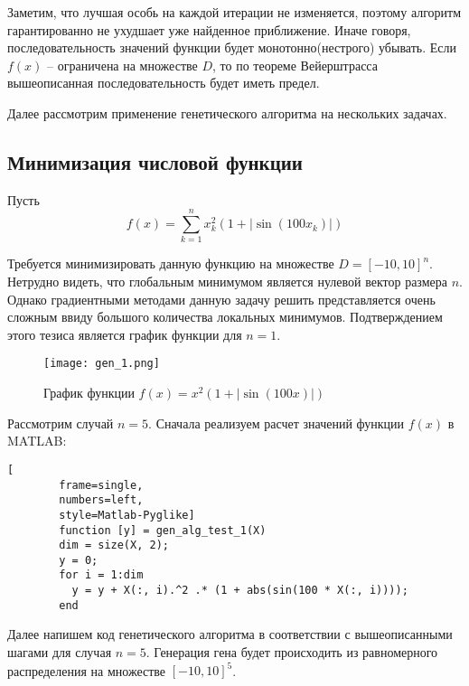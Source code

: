 \documentclass[../main.tex]{subfiles}
\begin{document}
	Заметим, что лучшая особь на каждой итерации не изменяется, поэтому алгоритм гарантированно не ухудшает уже найденное приближение. Иначе говоря, последовательность значений функции будет монотонно(нестрого) убывать. Если $f(x)$ -- ограничена на множестве $D$, то по теореме Вейерштрасса вышеописанная последовательность будет иметь предел.
	
	Далее рассмотрим применение генетического алгоритма на нескольких задачах.
	
	\subsection{Минимизация числовой функции}
	
	Пусть 
	\[f(x) = \sum_{k=1}^{n}x_k^2 (1 + |\sin{(100x_k)}|)\]
	
	Требуется минимизировать данную функцию на множестве $D = [-10, 10]^n$. Нетрудно видеть, что глобальным минимумом является нулевой вектор размера $n$. Однако градиентными методами данную задачу решить представляется очень сложным ввиду большого количества локальных минимумов. Подтверждением этого тезиса является график функции для $n=1$.
	
	
	\begin{figure}[H]
		\texttt{[image: gen\_1.png]}{}
		\caption{График функции $f(x) = x^2 (1 + |\sin(100x)|)$}
		\label{fig: gen_alg_test_1}
	\end{figure}
	
	
	
	
	Рассмотрим случай $n=5$. Сначала реализуем расчет значений функции $f(x)$ в MATLAB: 
	
	\begin{lstlisting}[
		frame=single,
		numbers=left,
		style=Matlab-Pyglike]
		function [y] = gen_alg_test_1(X)
		dim = size(X, 2);
		y = 0;
		for i = 1:dim
		  y = y + X(:, i).^2 .* (1 + abs(sin(100 * X(:, i))));
		end		
	\end{lstlisting}

	Далее напишем код генетического алгоритма в соответствии с вышеописанными шагами для случая $n=5$. Генерация гена будет происходить из равномерного распределения на множестве $[-10, 10]^5$.
	
\end{document}
